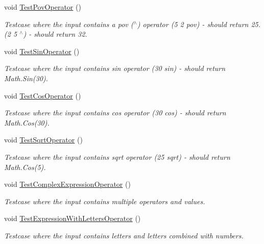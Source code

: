 \begin{DoxyCompactItemize}
void \hyperlink{class_reverse_polish_calculator_1_1_reverse_polish_calculator_tests_af6bc021afe5d36ba480bf6e8755a1913}{Test\+Pov\+Operator} ()
\begin{DoxyCompactList}\small\item\em Testcase where the input contains a pov ($^\wedge$) operator (5 2 pov) -\/ should return 25. (2 5 $^\wedge$) -\/ should return 32. \end{DoxyCompactList}\item 
void \hyperlink{class_reverse_polish_calculator_1_1_reverse_polish_calculator_tests_ad84dcd8782694291c48cb9fbe98e6b46}{Test\+Sin\+Operator} ()
\begin{DoxyCompactList}\small\item\em Testcase where the input contains sin operator (30 sin) -\/ should return Math.\+Sin(30). \end{DoxyCompactList}\item 
void \hyperlink{class_reverse_polish_calculator_1_1_reverse_polish_calculator_tests_ab079da8b18cee4c910fe872c646c7b23}{Test\+Cos\+Operator} ()
\begin{DoxyCompactList}\small\item\em Testcase where the input contains cos operator (30 cos) -\/ should return Math.\+Cos(30). \end{DoxyCompactList}\item 
void \hyperlink{class_reverse_polish_calculator_1_1_reverse_polish_calculator_tests_a50c1d58828cbb5180f1b0b202a48db00}{Test\+Sqrt\+Operator} ()
\begin{DoxyCompactList}\small\item\em Testcase where the input contains sqrt operator (25 sqrt) -\/ should return Math.\+Cos(5). \end{DoxyCompactList}\item 
void \hyperlink{class_reverse_polish_calculator_1_1_reverse_polish_calculator_tests_a58235c9b99031bd7a66a9a76b8d89fd5}{Test\+Complex\+Expression\+Operator} ()
\begin{DoxyCompactList}\small\item\em Testcase where the input contains multiple operators and values. \end{DoxyCompactList}\item 
void \hyperlink{class_reverse_polish_calculator_1_1_reverse_polish_calculator_tests_a646d50bfbe3b4130668ced392f2da2a2}{Test\+Expression\+With\+Letters\+Operator} ()
\begin{DoxyCompactList}\small\item\em Testcase where the input contains letters and letters combined with numbers. \end{DoxyCompactList}\end{DoxyCompactItemize}


